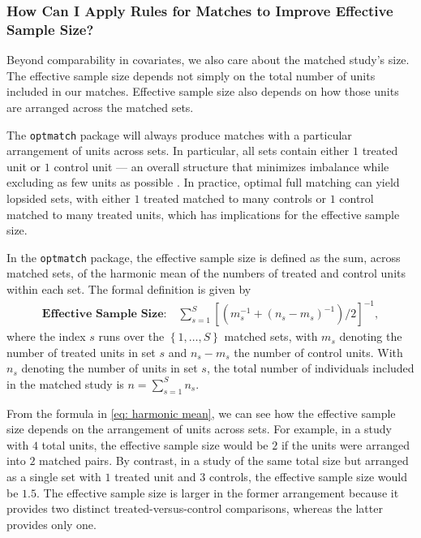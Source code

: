 \documentclass[
  12pt,
  leqno]{article}
\begin{document}
\doublespacing

\subsubsection{How Can I Apply Rules for Matches to Improve Effective
Sample
Size?}\label{how-can-i-apply-rules-for-matches-to-improve-effective-sample-size}

Beyond comparability in covariates, we also care about the matched
study's size. The effective sample size depends not simply on the total
number of units included in our matches. Effective sample size also
depends on how those units are arranged across the matched sets.

The \texttt{optmatch} package will always produce matches with a
particular arrangement of units across sets. In particular, all sets
contain either \(1\) treated unit or \(1\) control unit --- an overall
structure that minimizes imbalance while excluding as few units as
possible \citep{rosenbaum1991, gurosenbaum1993, hansen2004}. In
practice, optimal full matching can yield lopsided sets, with either
\(1\) treated matched to many controls or \(1\) control matched to many
treated units, which has implications for the effective sample size.

In the \texttt{optmatch} package, the effective sample size is defined
as the sum, across matched sets, of the harmonic mean of the numbers of
treated and control units within each set. The formal definition is
given by \begin{align} \label{eq: harmonic mean}
\textbf{Effective Sample Size:} \quad \sum \limits_{s = 1}^S \left[\left(m_s^{-1} + (n_s - m_s)^{-1}\right)/2\right]^{-1},
\end{align} where the index \(s\) runs over the
\(\left\{1, \dots , S\right\}\) matched sets, with \(m_{s}\) denoting
the number of treated units in set \(s\) and \(n_s - m_s\) the number of
control units. With \(n_s\) denoting the number of units in set \(s\),
the total number of individuals included in the matched study is
\(n = \sum_{s = 1}^S n_s\).

From the formula in \eqref{eq: harmonic mean}, we can see how the
effective sample size depends on the arrangement of units across sets.
For example, in a study with \(4\) total units, the effective sample
size would be \(2\) if the units were arranged into \(2\) matched pairs.
By contrast, in a study of the same total size but arranged as a single
set with \(1\) treated unit and \(3\) controls, the effective sample
size would be \(1.5\). The effective sample size is larger in the former
arrangement because it provides two distinct treated-versus-control
comparisons, whereas the latter provides only one.
\end{document}
